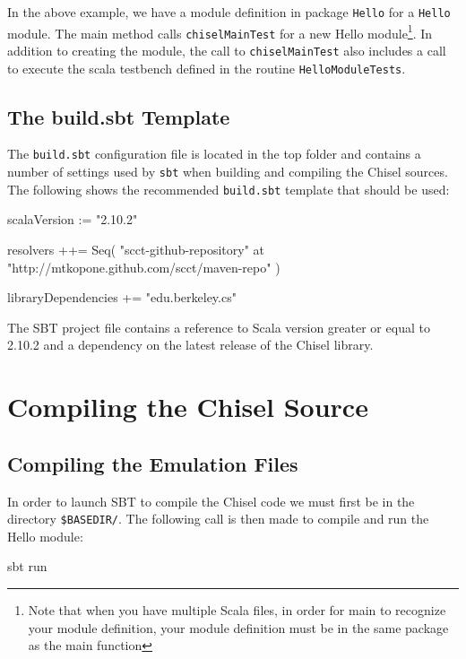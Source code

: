 In the above example, we have a module definition in package \verb+Hello+ for a \verb+Hello+ module. The main method calls \verb+chiselMainTest+ for a new Hello module\footnote{Note that when you have multiple Scala files, in order for main to recognize your module definition, your module definition must be in the same package as the main function}. In addition to creating the module, the call to \verb+chiselMainTest+ also includes a call to execute the scala testbench defined in the routine \verb+HelloModuleTests+.

\subsection{The build.sbt Template}

The \verb+build.sbt+ configuration file is located in the top folder and contains a number of settings used by \verb+sbt+ when building and compiling the Chisel sources.  The following shows the recommended \verb+build.sbt+ template that should be used:

\begin{scala}
scalaVersion := "2.10.2"

resolvers ++= Seq(
  "scct-github-repository" at "http://mtkopone.github.com/scct/maven-repo"
)

libraryDependencies += 
  "edu.berkeley.cs" %
\end{scala}

The SBT project file contains a reference to Scala version greater or equal to 2.10.2 and a dependency on the latest release of the Chisel library.

\section{Compiling the Chisel Source}

\subsection{Compiling the Emulation Files}

In order to launch SBT to compile the Chisel code we must first be in the directory \verb+$BASEDIR/+. The following call is then made to compile and run the Hello module:

\begin{bash}
sbt run
\end{bash}

